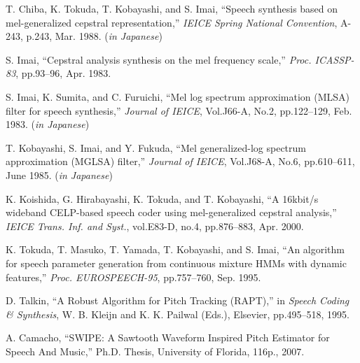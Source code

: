 \begin{thebibliography}{99}
T. Chiba, K. Tokuda, T. Kobayashi, and S. Imai,
``Speech synthesis based on mel-generalized cepstral representation,''
{\sl IEICE Spring National Convention},
A-243, p.243, Mar. 1988. ({\sl in Japanese})

S. Imai, 
``Cepstral analysis synthesis on the mel frequency scale,''
{\sl Proc. ICASSP-83},
pp.93--96, Apr. 1983.

S. Imai, K. Sumita, and C. Furuichi,
``Mel log spectrum approximation (MLSA) filter for speech synthesis,''
{\sl Journal of IEICE},
Vol.J66-A, No.2, pp.122--129, Feb. 1983. ({\sl in Japanese})

T. Kobayashi, S. Imai, and Y. Fukuda, 
``Mel generalized-log spectrum approximation (MGLSA) filter,''
{\sl Journal of IEICE},
Vol.J68-A, No.6, pp.610--611, June 1985. ({\sl in Japanese})

K. Koishida, G. Hirabayashi, K. Tokuda, and T. Kobayashi, 
``A 16kbit/s wideband CELP-based speech coder using mel-generalized cepstral analysis,'' 
{\sl IEICE Trans. Inf. and Syst.},
vol.E83-D, no.4, pp.876--883, Apr. 2000.


K. Tokuda, T. Masuko, T. Yamada, T. Kobayashi, and S. Imai,
``An algorithm for speech parameter generation
  from continuous mixture HMMs with dynamic features,''
{\sl Proc. EUROSPEECH-95}, pp.757--760, Sep. 1995.

D. Talkin, ``A Robust Algorithm for Pitch Tracking (RAPT),''
in {\sl Speech Coding \& Synthesis}, W. B. Kleijn and K. K. Pailwal
(Eds.), Elsevier, pp.495--518, 1995.

A. Camacho, ``SWIPE: A Sawtooth Waveform Inspired Pitch Estimator for Speech And
Music,'' Ph.D. Thesis, University of Florida, 116p., 2007.

\end{thebibliography}
